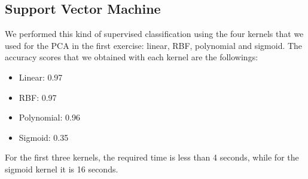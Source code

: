 \documentclass[12pt]{article}
\begin{document}
	\subsection*{Support Vector Machine}
	We performed this kind of supervised classification using the four kernels that we used for the PCA in the first exercise: linear, RBF, polynomial and sigmoid. The accuracy scores that we obtained with each kernel are the followings:
	\begin{itemize}
		\item Linear: 0.97
		\item RBF: 0.97
		\item Polynomial: 0.96
		\item Sigmoid: 0.35 
	\end{itemize}
	For the first three kernels, the required time is less than 4 seconds, while for the sigmoid kernel it is 16 seconds.
	
\end{document}
